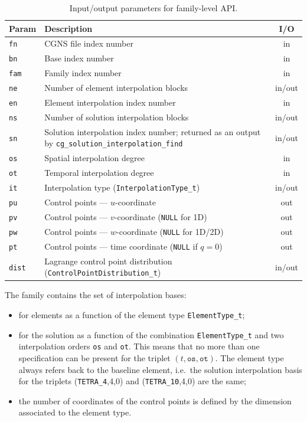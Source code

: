 \documentclass[11pt,letterpaper]{article}
\newenvironment{v2quote}
  {\begin{v2quoteframe}%
   \noindent{\footnotesize\sffamily\bfseries\color{cgnsblue}v2 text}%
   \nopagebreak\par\nopagebreak\vspace{0.15em}}
  {\end{v2quoteframe}}
\begin{document}
\begin{table}[htbp]
\centering
\small
{}
\begin{tabular}{@{} l p{} c @{}}
\toprule
\textbf{Param} & \textbf{Description} & \textbf{I/O} \\
\midrule
\texttt{fn}   & CGNS file index number & in \\
\texttt{bn}   & Base index number & in \\
\texttt{fam}  & Family index number & in \\
\texttt{ne}   & Number of element interpolation blocks & in/out \\
\texttt{en}   & Element interpolation index number & in \\
\texttt{ns}   & Number of solution interpolation blocks & in/out \\
\texttt{sn}   & Solution interpolation index number; returned as an output by
  \texttt{cg\_solution\_interpolation\_find} & in/out \\
\texttt{os}   & Spatial interpolation degree & in \\
\texttt{ot}   & Temporal interpolation degree & in \\
\texttt{it}   & Interpolation type (\texttt{InterpolationType\_t}) & in/out \\
\texttt{pu}   & Control points --- $u$-coordinate & out \\
\texttt{pv}   & Control points --- $v$-coordinate (\texttt{NULL} for 1D) & out \\
\texttt{pw}   & Control points --- $w$-coordinate (\texttt{NULL} for 1D/2D) & out \\
\texttt{pt}    & Control points --- time coordinate (\texttt{NULL} if $q=0$) & out \\
\texttt{dist} & Lagrange control point distribution (\texttt{ControlPointDistribution\_t}) & in/out \\
\bottomrule
\end{tabular}
\caption{Input/output parameters for family-level API.}
\end{table}

\begin{v2quote}
The family contains the set of interpolation bases:
\begin{itemize}
  \item for elements as a function of the element type \texttt{ElementType\_t};
  \item for the solution as a function of the combination \texttt{ElementType\_t} and two
    interpolation orders \texttt{os} and \texttt{ot}.  This means that no more than one
    specification can be present for the triplet $(t, \texttt{os}, \texttt{ot})$.  The element
    type always refers back to the baseline element, i.e.\ the solution interpolation basis for
    the triplets (\texttt{TETRA\_4},4,0) and (\texttt{TETRA\_10},4,0) are the same;
  \item the number of coordinates of the control points is defined by the dimension associated
    to the element type.
\end{itemize}
\end{v2quote}
\end{document}
